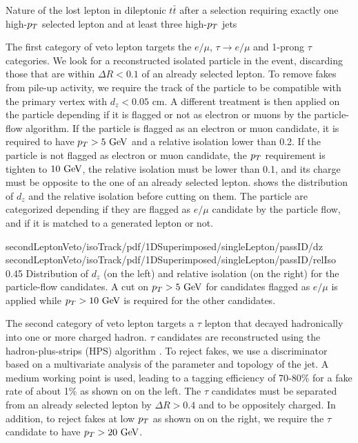                  {Nature of the lost lepton in dileptonic $t\bar{t}$ after a selection
                 requiring exactly one high-$p_T$ selected lepton and at least three
                 high-$p_T$ jets}

    The first category of veto lepton targets the $e/\mu$, $\tau \rightarrow e/\mu$ and
    1-prong $\tau$ categories. We look for a reconstructed isolated particle in the event,
    discarding those that are within $\Delta R < 0.1$ of an already selected lepton. To
    remove fakes from pile-up activity, we require the track of the particle to be
    compatible with the primary vertex with $d_z < 0.05$ cm. A different treatment is then
    applied on the particle depending if it is flagged or not as electron or muons by the
    particle-flow algorithm. If the particle is flagged as an electron or muon candidate,
    it is required to have $p_T > 5~\text{GeV}$ and a relative isolation lower than 0.2.
    If the particle is not flagged as electron or muon candidate, the $p_T$ requirement
    is tighten to $10~\text{GeV}$, the relative isolation must be lower than 0.1, and its charge
    must be opposite to the one of an already selected lepton.
     shows the distribution of $d_z$ and the
    relative isolation before cutting on them. The particle are categorized depending if
    they are flagged as $e/\mu$ candidate by the particle flow, and if it is matched to a
    generated lepton or not.

                     {secondLeptonVeto/isoTrack/pdf/1DSuperimposed/singleLepton/passID/dz}
                     {secondLeptonVeto/isoTrack/pdf/1DSuperimposed/singleLepton/passID/relIso}
                     {0.45}
                     {Distribution of $d_z$ (on the left) and relative isolation (on the right)
                     for the particle-flow candidates. A cut on $p_T > 5~\text{GeV}$ for candidates
                     flagged as $e/\mu$ is applied while $p_T > 10~\text{GeV}$ is required for
                     the other candidates.}

    The second category of veto lepton targets a $\tau$ lepton that decayed hadronically
    into one or more charged hadron. $\tau$ candidates are reconstructed using the
    hadron-plus-strips (HPS) algorithm . To reject fakes, we use a discriminator
    based on a multivariate analysis of the parameter and topology of the jet. A medium
    working point is used, leading to a tagging efficiency of 70-80\% for a fake rate of
    about 1\% as shown on  on the left. The $\tau$
    candidates must be separated from an already selected lepton by $\Delta R > 0.4$ and
    to be oppositely charged. In addition, to reject fakes at low $p_T$ as shown on
     on the right, we require the $\tau$ candidate to have
    $p_T > 20~\text{GeV}$.

